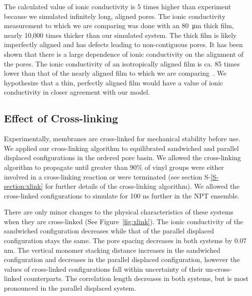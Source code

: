 \documentclass[journal=jpcbfk,manuscript=article]{achemso}
\begin{document}

  The calculated value of ionic conductivity is 5 times higher than experiment because 
  we simulated infinitely long, aligned pores. The ionic conductivity measurement 
  to which we are comparing was done with an \SI{80}{\micro\metre} thick film, 
  nearly 10,000 times thicker than our simulated
  system. The thick film is likely imperfectly aligned and has defects leading to
  non-contiguous pores. It has been shown that there is a large dependence of 
  ionic conductivity on the alignment of the pores. The ionic conductivity of an
  isotropically aligned film is ca. 85 times lower than that of the nearly aligned
  film to which we are comparing~\cite{feng_scalable_2014}. We hypothesize that a 
  thin, perfectly aligned film would have a value of ionic conductivity in closer
  agreement with our model.

  \subsection{Effect of Cross-linking}\label{section:xlink}

  Experimentally, membranes are cross-linked for mechanical stability before use. We applied 
  our cross-linking algorithm to equilibrated sandwiched and parallel
  displaced configurations in the ordered pore basin. We allowed the cross-linking
  algorithm to propagate until greater than 90\% of vinyl groups were either involved
  in a cross-linking reaction or were terminated (see section S-\ref{S-section:xlink}
  for further details of the cross-linking algorithm). We allowed the cross-linked
  configurations to simulate for 100 ns further in the NPT ensemble. 

  There are only minor changes to the physical characteristics of these systems when 
  they are cross-linked (See Figure~\ref{fig:xlink}). The ionic conductivity of 
  the sandwiched configuration decreases while that of the parallel displaced 
  configuration stays the same. The pore spacing decreases in both systems by
  0.07 nm. The vertical monomer stacking distance increases in the sandwiched
  configuration and decreases in the parallel displaced configuration, however the 
  values of cross-linked configurations fall within uncertainty of their un-cross-linked
  counterparts. The correlation length decreases in both systems, 
  but is most pronounced in the parallel displaced system.  
  
\end{document}
